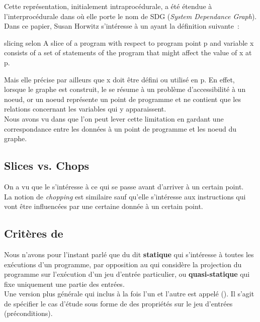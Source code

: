 Cette représentation, initialement intraprocédurale, a été étendue
à l'interprocédurale dans \cite{horwitz88interprocedural} où elle
porte le nom de SDG ({\it System Dependance Graph}).
Dans ce papier, Susan Horwitz s'intéresse à un \slicing
ayant la définition suivante~:

\begin{definition}{slicing selon \cite{horwitz88interprocedural}}
A slice of a program with respect to program point p and variable x
consists of a set of statements of the program that might affect
the value of x at p.
\end{definition}

Mais elle précise par ailleurs que x doit être défini ou utilisé en p.
En effet, lorsque le graphe est construit, le \slicing se résume à un
problème d'accessibilité à un noeud, or un noeud représente un
point de programme et ne contient que les relations concernant les variables
qui y apparaissent.\\

Nous avons vu dans \cite{ppcPdg} que l'on peut lever cette limitation en gardant
une correspondance entre les données à un point de programme et les noeud du
graphe.

\subsection{Slices vs. Chops}

On a vu que le \slicing s'intéresse à ce qui se passe avant d'arriver
à un certain point.\\

La notion de {\it chopping} est similaire sauf qu'elle s'intéresse
aux instructions qui vont être influencées par une certaine donnée
à un certain point.

\subsection{Critères de \slicing}

Nous n'avons pour l'instant parlé que du \slicing dit {\bf statique}
qui s'intéresse à toutes les exécutions d'un programme,
par opposition au 
 qui considère la projection du programme
sur l'exécution d'un jeu d'entrée particulier,
ou {\bf quasi-statique} qui fixe uniquement une partie des entrées.\\

Une version plus générale qui inclus à la fois l'un et l'autre
est appelé  (\cite{fox-consit}).
Il s'agit de spécifier le cas d'étude sous forme de
des propriétés sur le jeu d'entrées (préconditions).\\

